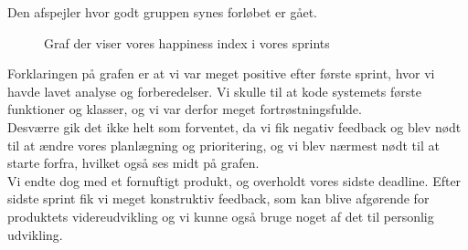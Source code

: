 Den afspejler hvor godt gruppen synes forløbet er gået.
\begin{figure}[H]
    \caption{Graf der viser vores happiness index i vores sprints}
    \label{fig:happi}
\end{figure}
\noindent
Forklaringen på grafen er at vi var meget positive efter første sprint, hvor vi havde lavet analyse og forberedelser.
Vi skulle til at kode systemets første funktioner og klasser, og vi var derfor meget fortrøstningsfulde.
\\
Desværre gik det ikke helt som forventet, da vi fik negativ feedback og blev nødt til at ændre vores planlægning og prioritering,
og vi blev nærmest nødt til at starte forfra, hvilket også ses midt på grafen.
\\
Vi endte dog med et fornuftigt produkt, og overholdt vores sidste deadline. Efter sidste sprint fik vi meget konstruktiv feedback, 
som kan blive afgørende for produktets videreudvikling og vi kunne også bruge noget af det til personlig udvikling.


